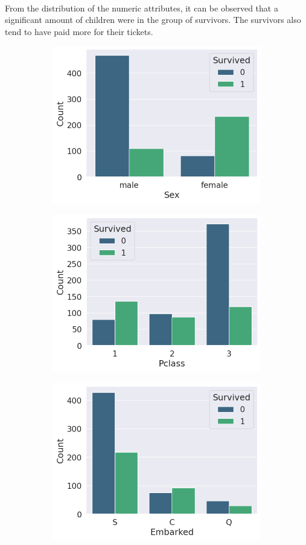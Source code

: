 \documentclass{article}
\begin{document}
\paragraph{}From the distribution of the numeric attributes, it can be observed that a significant amount of children were in the group of survivors. The survivors also tend to have paid more for their tickets.
\newpage
\begin{figure}[htb]
    \centering
    \begin{subfigure}
        \centering
        \includegraphics[width=0.49\linewidth]{sex.png}
    \end{subfigure}
    \begin{subfigure}
        \centering
        \includegraphics[width=0.49\linewidth]{pclass.png}
    \end{subfigure}
    \begin{subfigure}
        \centering
        \includegraphics[width=0.49\linewidth]{embarked.png}
    \end{subfigure}
    \begin{subfigure}

\end{subfigure}
\end{figure}
\end{document}
